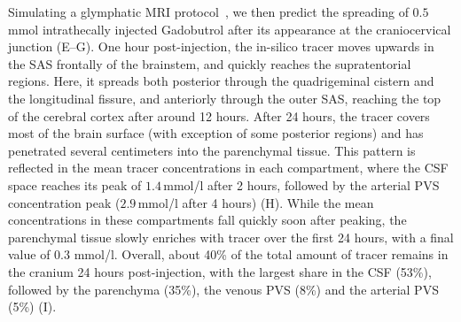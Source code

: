 \documentclass[fleqn,10pt]{wlscirep}
\begin{document}
Simulating a glymphatic MRI protocol~\cite{ringstad2017glymphatic,
  ringstad2018brain, eide2024functional}, we then predict the
spreading of $0.5$ mmol intrathecally injected Gadobutrol after its
appearance at the craniocervical junction
(E--G). One hour post-injection, the in-silico
tracer moves upwards in the SAS frontally of the brainstem, and
quickly reaches the supratentorial regions. Here, it spreads both
posterior through the quadrigeminal cistern and the longitudinal
fissure, and anteriorly through the outer SAS, reaching the top of the
cerebral cortex after around 12 hours. After 24 hours, the tracer
covers most of the brain surface (with exception of some posterior
regions) and has penetrated several centimeters into the parenchymal
tissue. This pattern is reflected in the mean tracer concentrations in
each compartment, where the CSF space reaches its peak of
$1.4\,$mmol/l after 2 hours, followed by the arterial PVS
concentration peak ($2.9\,$mmol/l after 4 hours)
(H). While the mean concentrations in these
compartments fall quickly soon after peaking, the parenchymal tissue
slowly enriches with tracer over the first 24 hours, with a final
value of $0.3$ mmol/l. Overall, about 40\% of the total amount of
tracer remains in the cranium 24 hours post-injection, with the largest
share in the CSF (53\%), followed by the parenchyma (35\%), the
venous PVS (8\%) and the arterial PVS
(5\%) (I).
\end{document}
